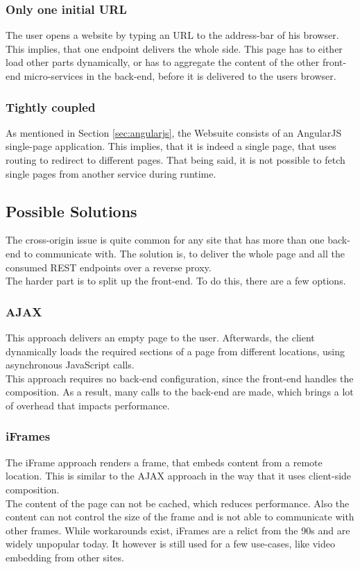 \subsubsection{Only one initial URL}
The user opens a website by typing an URL to the address-bar of his browser. This implies, that one endpoint delivers the whole side. This page has to either load other parts dynamically, or has to aggregate the content of the other front-end micro-services in the back-end, before it is delivered to the users browser.

\subsubsection{Tightly coupled}
As mentioned in Section \ref{sec:angularjs}, the Websuite consists of an AngularJS single-page application. This implies, that it is indeed a single page, that uses routing to redirect to different pages. That being said, it is not possible to fetch single pages from another service during runtime.

\subsection{Possible Solutions}
The cross-origin issue is quite common for any site that has more than one back-end to communicate with. The solution is, to deliver the whole page and all the consumed REST endpoints over a reverse proxy.\\
The harder part is to split up the front-end. To do this, there are a few options.

\subsubsection{AJAX}
This approach delivers an empty page to the user. Afterwards, the client dynamically loads the required sections of a page from different locations, using asynchronous JavaScript calls.\\
This approach requires no back-end configuration, since the front-end handles the composition. As a result, many calls to the back-end are made, which brings a lot of overhead that impacts performance.

\subsubsection{iFrames}
The iFrame approach renders a frame, that embeds content from a remote location. This is similar to the AJAX approach in the way that it uses client-side composition.\\
The content of the page can not be cached, which reduces performance. Also the content can not control the size of the frame and is not able to communicate with other frames. While workarounds exist, iFrames are a relict from the 90s and are widely unpopular today. It however is still used for a few use-cases, like video embedding from other sites.

